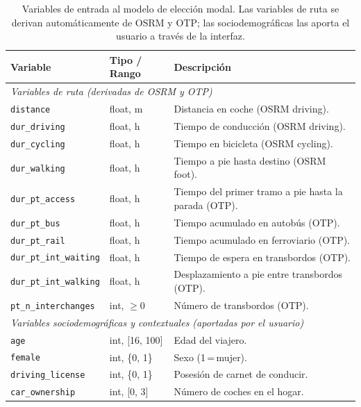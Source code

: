 \begin{table}[htbp]
  \caption{Variables de entrada al modelo de elección modal. Las variables de ruta se derivan automáticamente de OSRM y OTP; las sociodemográficas las aporta el usuario a través de la interfaz.}
  \label{tab:lpmc_features}
  \centering
  \begin{tabular}{llp{5.5cm}}
    \toprule
    \textbf{Variable} & \textbf{Tipo / Rango} & \textbf{Descripción} \\
    \midrule
    \multicolumn{3}{l}{\textit{Variables de ruta (derivadas de OSRM y OTP)}} \\
    \midrule
    \texttt{distance}              & float, m         & Distancia en coche (OSRM driving). \\
    \texttt{dur\_driving}          & float, h         & Tiempo de conducción (OSRM driving). \\
    \texttt{dur\_cycling}          & float, h         & Tiempo en bicicleta (OSRM cycling). \\
    \texttt{dur\_walking}          & float, h         & Tiempo a pie hasta destino (OSRM foot). \\
    \texttt{dur\_pt\_access}       & float, h         & Tiempo del primer tramo a pie hasta la parada (OTP). \\
    \texttt{dur\_pt\_bus}          & float, h         & Tiempo acumulado en autobús (OTP). \\
    \texttt{dur\_pt\_rail}         & float, h         & Tiempo acumulado en ferroviario (OTP). \\
    \texttt{dur\_pt\_int\_waiting} & float, h         & Tiempo de espera en transbordos (OTP). \\
    \texttt{dur\_pt\_int\_walking} & float, h         & Desplazamiento a pie entre transbordos (OTP). \\
    \texttt{pt\_n\_interchanges}   & int, $\geq 0$    & Número de transbordos (OTP). \\
    \midrule
    \multicolumn{3}{l}{\textit{Variables sociodemográficas y contextuales (aportadas por el usuario)}} \\
    \midrule
    \texttt{age}                   & int, [16, 100]   & Edad del viajero. \\
    \texttt{female}                & int, \{0, 1\}    & Sexo (1\,=\,mujer). \\
    \texttt{driving\_license}      & int, \{0, 1\}    & Posesión de carnet de conducir. \\
    \texttt{car\_ownership}        & int, [0, 3]      & Número de coches en el hogar. \\

\end{tabular}
\end{table}
